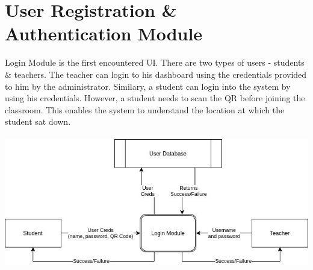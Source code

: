 \documentclass[10pt]{report}
\begin{document}
\section{User Registration \& Authentication Module}
Login Module is the first encountered UI. There are two types of users - students \& teachers. The teacher can login to his dashboard using the credentials provided to him by the administrator. Similary, a student can login into the system by using his credentials. However, a student needs to scan the QR before joining the classroom. This enables the system to understand the location at which the student sat down.  \\ \\ 
\includegraphics[width=\textwidth]{LoginModule.jpg}
\end{document}
